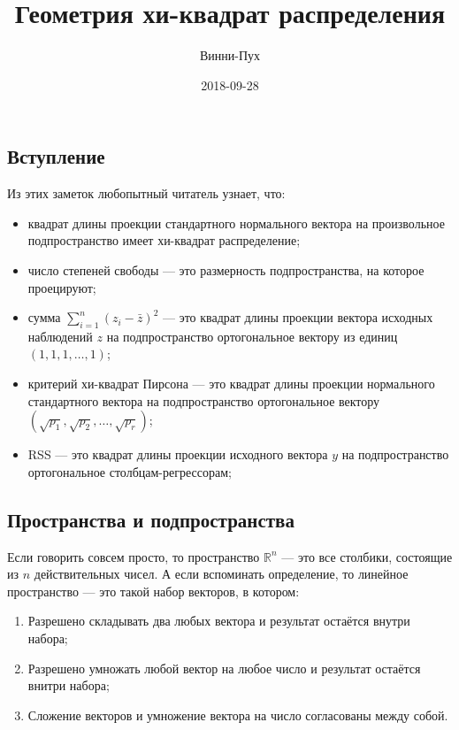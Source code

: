 \documentclass[11pt,russian,]{article}
\title{Геометрия хи-квадрат распределения}
\author{Винни-Пух}
\date{2018-09-28}
\providecommand{\tightlist}{%
  \setlength{\itemsep}{0pt}\setlength{\parskip}{0pt}}
\newcommand{\RR}{\mathbb{R}}
\renewcommand{\Rn}{\RR^n}
\newcommand{\1}{\mathbbm{1}}
\begin{document}
\maketitle

{
\setcounter{tocdepth}{2}
\tableofcontents
}
\subsection{Вступление}

Из этих заметок любопытный читатель узнает, что:

\begin{itemize}
\item
  квадрат длины проекции стандартного нормального вектора на
  произвольное подпространство имеет хи-квадрат распределение;
\item
  число степеней свободы --- это размерность подпространства, на которое
  проецируют;
\item
  сумма \(\sum_{i=1}^n (z_i - \bar z)^2\) --- это квадрат длины проекции
  вектора исходных наблюдений \(z\) на подпространство ортогональное
  вектору из единиц \((1, 1, 1, \ldots, 1)\);
\item
  критерий хи-квадрат Пирсона --- это квадрат длины проекции нормального
  стандартного вектора на подпространство ортогональное вектору
  \((\sqrt{p_1}, \sqrt{p_2}, \ldots, \sqrt{p_r})\);
\item
  RSS --- это квадрат длины проекции исходного вектора \(y\) на
  подпространство ортогональное столбцам-регрессорам;
\end{itemize}

\subsection{Пространства и подпространства}\label{--}

Если говорить совсем просто, то пространство \(\Rn\) --- это все
столбики, состоящие из \(n\) действительных чисел. А если вспоминать
определение, то линейное пространство --- это такой набор векторов, в
котором:

\begin{enumerate}
\def\labelenumi{\arabic{enumi}.}
\tightlist
\item
  Разрешено складывать два любых вектора и результат остаётся внутри
  набора;
\item
  Разрешено умножать любой вектор на любое число и результат остаётся
  внитри набора;
\item
  Сложение векторов и умножение вектора на число согласованы между
  собой.
\end{enumerate}
\end{document}
